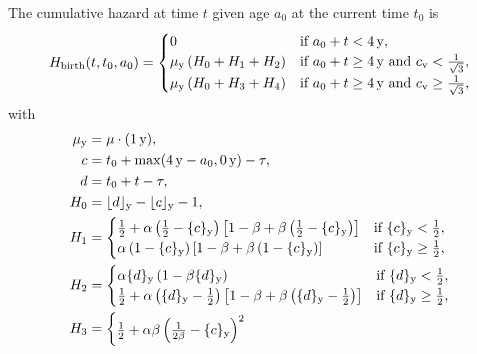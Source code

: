 \documentclass[12pt, USenglish]{article}  %
\begin{document}
The cumulative hazard at time $t$ given age $a_0$ at the current
time $t_0$ is
\begin{equation}
  H_{\text{birth}}(t, t_0, a_0) =
  \begin{cases}
    0 & \text{if $a_0 + t < \unit[4]{y}$},
    \\
    \mu_{\mathrm{y}} \left(H_0 + H_1  + H_2\right)
    & \text{if $a_0 + t \geq \unit[4]{y}$
      and $c_{\text{v}} < \frac{1}{\sqrt{3}}$},
    \\
    \mu_{\mathrm{y}} \left(H_0 + H_3 + H_4\right)
    & \text{if $a_0 + t \geq \unit[4]{y}$
      and $c_{\text{v}} \geq \frac{1}{\sqrt{3}}$},
  \end{cases}
\end{equation}
with
\begin{equation}
  \begin{split}
    \mu_{\mathrm{y}} &= \mu \cdot (\unit[1]{y}),
    \\
    c &= t_0 + \max(\unit[4]{y} - a_0, \unit[0]{y}) - \tau,
    \\
    d &= t_0 + t - \tau,
    \\
    H_0 &= \lfloor d \rfloor_{\mathrm{y}} - \lfloor c \rfloor_{\mathrm{y}} - 1,
    \\
    H_1 &=
    \begin{cases}
      \frac{1}{2}
      + \alpha \left(\frac{1}{2} - \{c\}_{\mathrm{y}}\right)
      \left[1 - \beta
        + \beta \left(\frac{1}{2} - \{c\}_{\mathrm{y}}\right)\right]
      & \text{if $\{c\}_{\mathrm{y}} < \frac{1}{2}$},
      \\
      \alpha \left(1 - \{c\}_{\mathrm{y}}\right)
      \left[1 - \beta + \beta \left(1 - \{c\}_{\mathrm{y}}\right)\right]
      & \text{if $\{c\}_{\mathrm{y}} \geq \frac{1}{2}$},
    \end{cases}
    \\
    H_2 &=
    \begin{cases}
      \alpha \{d\}_{\mathrm{y}}\left(1 - \beta \{d\}_{\mathrm{y}}\right)
      & \text{if $\{d\}_{\mathrm{y}} < \frac{1}{2}$},
      \\
      \frac{1}{2}
      + \alpha \left(\{d\}_{\mathrm{y}} - \frac{1}{2}\right)
      \left[1 - \beta
        + \beta \left(\{d\}_{\mathrm{y}} - \frac{1}{2}\right)\right]
      & \text{if $\{d\}_{\mathrm{y}} \geq \frac{1}{2}$},
    \end{cases}
    \\
    H_3 &=
    \begin{cases}
      \frac{1}{2} + \alpha \beta \left(\frac{1}{2 \beta} - \{c\}_{\mathrm{y}}\right)^2

\end{cases}
\end{split}
\end{equation}
\end{document}

